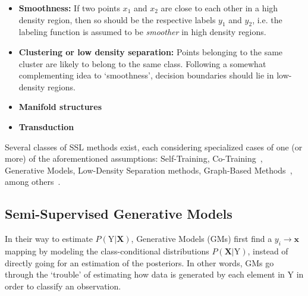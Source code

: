 \begin{itemize}

    \item \textbf{Smoothness:} If two points $x_1$ and $x_2$ are close to each other in 
            a high density region, then so should be the respective labels 
            $y_1$ and $y_2$, i.e. the labeling function is assumed to be 
            \textit{smoother} in high density regions.
    \item \textbf{Clustering or low density separation:} Points belonging to the same cluster are likely 
            to belong to the same class. Following a somewhat complementing idea to 
            `smoothness', decision boundaries should 
            lie in low-density regions.
    \item \textbf{Manifold structures}~\cite{chapelle2010semi}
    \item \textbf{Transduction}~\cite{chapelle2010semi}

\end{itemize}

Several classes of SSL methods exist, each considering specialized cases of one 
(or more) of the 
aforementioned assumptions: Self-Training, Co-Training~\cite{zhu05survey}, Generative Models,
Low-Density Separation methods, Graph-Based Methods~\cite{chapelle2010semi}, among 
others~\cite{zhu05survey}.

\subsection{Semi-Supervised Generative Models}
\label{subsec:gen-models}

In their way to estimate 
$P(\text{Y}|\textbf{X})$, Generative Models (GMs) first find a $y_i \rightarrow \textbf{x}$ mapping by modeling the 
class-conditional distributions $P(\textbf{X}|\text{Y})$, instead of directly going for 
an estimation of the posteriors. In other words, GMs go through the `trouble' of 
estimating how data is generated by each element in Y 
in order to classify an observation.\vertbreak 

